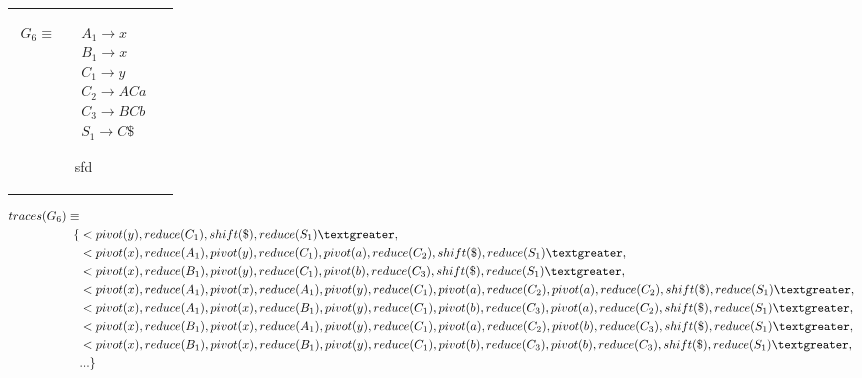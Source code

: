 \documentclass[11pt]{article}
\begin{document}
\subsubsection{}
\begin{tabular}[t]{cl}
\parbox{.3\textwidth}{
\begin{align*}
G_6 \equiv \quad & A_1 \rightarrow x\\
                 & B_1 \rightarrow x\\
                 & C_1 \rightarrow y\\
                 & C_2 \rightarrow A C a\\
                 & C_3 \rightarrow B C b\\
                 & S_1 \rightarrow C \$
\end{align*}}
\parbox{.8\textwidth}{sfd}
\end{tabular}

\begin{align*}
traces(G_6) \equiv \\
\{ & \textless pivot(y), reduce(C_1), shift(\$), reduce(S_1) \textgreater,\\
                      & \textless pivot(x), reduce(A_1), pivot(y), reduce(C_1), pivot(a), reduce(C_2), shift(\$), reduce(S_1) \textgreater,\\
                      & \textless pivot(x), reduce(B_1), pivot(y), reduce(C_1), pivot(b), reduce(C_3), shift(\$), reduce(S_1) \textgreater,\\
                      & \textless pivot(x), reduce(A_1), pivot(x), reduce(A_1), pivot(y), reduce(C_1), pivot(a), reduce(C_2), pivot(a), reduce(C_2), shift(\$), reduce(S_1) \textgreater,\\
                      & \textless pivot(x), reduce(A_1), pivot(x), reduce(B_1), pivot(y), reduce(C_1), pivot(b), reduce(C_3), pivot(a), reduce(C_2), shift(\$), reduce(S_1) \textgreater,\\
                      & \textless pivot(x), reduce(B_1), pivot(x), reduce(A_1), pivot(y), reduce(C_1), pivot(a), reduce(C_2), pivot(b), reduce(C_3), shift(\$), reduce(S_1) \textgreater,\\
                      & \textless pivot(x), reduce(B_1), pivot(x), reduce(B_1), pivot(y), reduce(C_1), pivot(b), reduce(C_3), pivot(b), reduce(C_3), shift(\$), reduce(S_1) \textgreater,\\
                      & ... \}
\end{align*}
\end{document}
